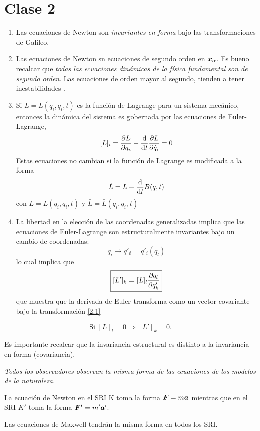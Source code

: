 \section{Clase 2}
\begin{enumerate}
	\item Las ecuaciones de Newton son \textit{invariantes en forma} bajo las transformaciones de Galileo.
	\item Las ecuaciones de Newton sn ecuaciones de segundo orden en $\vb*{x}_\alpha$. Es bueno recalcar que \textit{todas las ecuaciones dinámicas de la física fundamental son de segundo orden}. Las ecuaciones de orden mayor al segundo, tienden a tener inestabilidades \cite{Ostrogradsky:1850fid}.
	\item Si $L=L(q_i,\dot{q}_i,t)$ es la función de Lagrange para un sistema mecánico, entonces la dinámica del sistema es gobernada por las ecuaciones de Euler-Lagrange,
	\begin{equation}\label{eqs EL}
  [L]_i=\pdv{L}{q_i}-\dv{t}\pdv{L}{\dot{q}_i}=0
\end{equation}
Estas ecuaciones no cambian si la función de Lagrange es modificada a la forma
\begin{equation}
  \tilde{L}=L+\dv{t}B(q,t)
\end{equation}
con $L=L(q_i,\dot{q}_i,t)$ y $\bar{L}=\bar{L}(q_i,\dot{q}_i,t)$
\item La libertad en la elección de las coordenadas generalizadas implica que las ecuaciones de Euler-Lagrange son estructuralmente invariantes bajo un cambio de coordenadas:
\begin{equation}\label{2.1}
  q_i\to q'_i=q'_i(q_l)
\end{equation}
lo cual implica que
\begin{equation}
  \boxed{[L']_k=[L]_l\pdv{q_l}{q'_k}}
\end{equation}
que muestra que la derivada de Euler transforma como un vector covariante bajo la transformación \ref{2.1}
\end{enumerate}
\begin{equation}
  \mbox{Si }[L]_l=0 \Rightarrow [L']_k=0.
\end{equation}

Es importante recalcar que la invariancia estructural es distinto a la invariancia en forma (covariancia).

\textit{Todos los observadores observan la misma forma de las ecuaciones de los modelos de la naturaleza.}

\begin{ej}
	La ecuación de Newton en el SRI K toma la forma $\vb*{F}=m\vb*{a}$ mientras que en el SRI $K'$ toma la forma $\vb*{F'}=m'\vb*{a}'$.
\end{ej}
\begin{ej}
	Las ecuaciones de Maxwell tendrán la misma forma en todos los SRI.
\end{ej}


